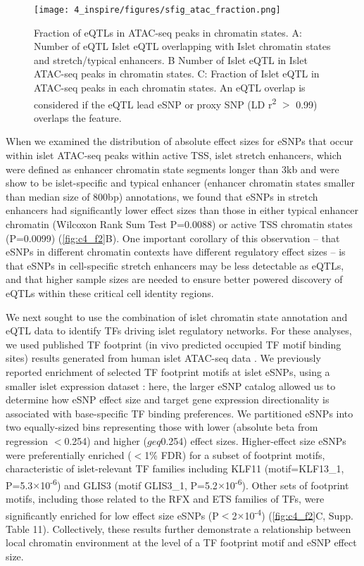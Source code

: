 \begin{figure}
    \centering
    \texttt{[image: 4\_inspire/figures/sfig\_atac\_fraction.png]}
    \caption[Fraction of eQTLs in ATAC-seq peaks in chromatin states]{Fraction of eQTLs in ATAC-seq peaks in chromatin states. A: Number of eQTL Islet eQTL overlapping with Islet chromatin states and stretch/typical enhancers. B Number of Islet eQTL in Islet ATAC-seq peaks in chromatin states. C: Fraction of Islet eQTL in ATAC-seq peaks in each chromatin states. An eQTL overlap is considered if the eQTL lead eSNP or proxy SNP (LD r\textsuperscript{2} $>$ 0.99) overlaps the feature.}
    \label{fig:c4_sf_atac_fraction}
\end{figure}

When we examined the distribution of absolute effect sizes for eSNPs that occur within islet ATAC-seq peaks within active TSS, islet stretch enhancers, which were defined as enhancer chromatin state segments longer than 3kb and were show to be islet-specific \cite{parkerChromatinStretchEnhancer2013} and typical enhancer (enhancer chromatin states smaller than median size of 800bp) annotations, we found that eSNPs in stretch enhancers had significantly lower effect sizes than those in either typical enhancer chromatin (Wilcoxon Rank Sum Test P=0.0088) or active TSS chromatin states (P=0.0099) (\ref{fig:c4_f2}B). One important corollary of this observation – that eSNPs in different chromatin contexts have different regulatory effect sizes – is that eSNPs in cell-specific stretch enhancers may be less detectable as eQTLs, and that higher sample sizes are needed to ensure better powered discovery of eQTLs within these critical cell identity regions.

We next sought to use the combination of islet chromatin state annotation and eQTL data to identify TFs driving islet regulatory networks. For these analyses, we used published TF footprint (in vivo predicted occupied TF motif binding sites) results generated from human islet ATAC-seq data \cite{varshneyGeneticRegulatorySignatures2017}. We previously reported enrichment of selected TF footprint motifs at islet eSNPs, using a smaller islet expression dataset \cite{varshneyGeneticRegulatorySignatures2017}: here, the larger eSNP catalog allowed us to determine how eSNP effect size and target gene expression directionality is associated with base-specific TF binding preferences. We partitioned eSNPs into two equally-sized bins representing those with lower (absolute beta from regression $<$0.254) and higher ($geq$0.254) effect sizes. Higher-effect size eSNPs were preferentially enriched ($<$1\% FDR) for a subset of footprint motifs, characteristic of islet-relevant TF families including KLF11 (motif=KLF13\_1, P=5.3$\times$10\textsuperscript{-6}) and GLIS3 (motif GLIS3\_1, P=5.2$\times$10\textsuperscript{-6}). Other sets of footprint motifs, including those related to the RFX and ETS families of TFs, were significantly enriched for low effect size eSNPs (P$<$2$\times$10\textsuperscript{-4}) (\ref{fig:c4_f2}C, Supp. Table 11). Collectively, these results further demonstrate a relationship between local chromatin environment at the level of a TF footprint motif and eSNP effect size. 	
 	
